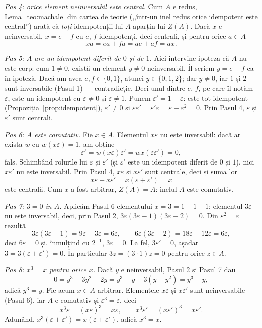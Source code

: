 \begin{solutie}
\smallskip
\textit{Pas 4: orice element neinversabil este central.} Cum $A$ e redus,
Lema~\ref{teo:machale} din cartea de teorie (,,într-un inel redus orice
idempotent este central'') arată că \emph{toți} idempotenții lui $A$
aparțin lui $Z(A)$. Dacă $x$ e neinversabil, $x=e+f$ cu $e$, $f$
idempotenți, deci centrali, și pentru orice $a\in A$
\[
  xa=ea+fa=ae+af=ax .
\]

\smallskip
\textit{Pas 5: $A$ are un idempotent diferit de $0$ și de $1$.} Aici
intervine ipoteza că $A$ nu este corp: cum $1\neq0$, există un element
$y\neq0$ neinversabil. Îl scriem $y=e+f$ ca în ipoteză. Dacă am avea
$e,f\in\{0,1\}$, atunci $y\in\{0,1,2\}$; dar $y\neq0$, iar $1$ și $2$
sunt inversabile (Pasul 1) --- contradicție. Deci unul dintre $e$, $f$,
pe care îl notăm $\varepsilon$, este un idempotent cu $\varepsilon\neq0$ și
$\varepsilon\neq1$. Punem $\varepsilon'=1-\varepsilon$: este tot idempotent
(Propoziția~\ref{prop:idempotent}), $\varepsilon'\neq0$ și
$\varepsilon\varepsilon'=\varepsilon'\varepsilon=\varepsilon-\varepsilon^{2}=0$.
Prin Pasul 4, $\varepsilon$ și $\varepsilon'$ sunt centrali.

\smallskip
\textit{Pas 6: $A$ este comutativ.} Fie $x\in A$. Elementul $x\varepsilon$
nu este inversabil: dacă ar exista $w$ cu $w(x\varepsilon)=1$, am obține
\[
  \varepsilon'=w(x\varepsilon)\varepsilon'=wx(\varepsilon\varepsilon')=0,
\]
fals. Schimbând rolurile lui $\varepsilon$ și $\varepsilon'$ (și
$\varepsilon'$ este un idempotent diferit de $0$ și $1$), nici
$x\varepsilon'$ nu este inversabil. Prin Pasul 4, $x\varepsilon$ și
$x\varepsilon'$ sunt centrale, deci și suma lor
\[
  x\varepsilon+x\varepsilon'=x(\varepsilon+\varepsilon')=x
\]
este centrală. Cum $x$ a fost arbitrar, $Z(A)=A$: inelul $A$ este comutativ.

\smallskip
\textit{Pas 7: $3=0$ în $A$.} Aplicăm Pasul 6 elementului $x=3=1+1+1$:
elementul $3\varepsilon$ nu este inversabil, deci, prin Pasul 2,
$3\varepsilon(3\varepsilon-1)(3\varepsilon-2)=0$. Din
$\varepsilon^{2}=\varepsilon$ rezultă
\[
  3\varepsilon(3\varepsilon-1)=9\varepsilon-3\varepsilon=6\varepsilon,\qquad
  6\varepsilon(3\varepsilon-2)=18\varepsilon-12\varepsilon=6\varepsilon ,
\]
deci $6\varepsilon=0$ și, înmulțind cu $2^{-1}$, $3\varepsilon=0$. La fel,
$3\varepsilon'=0$, așadar $3=3(\varepsilon+\varepsilon')=0$. În particular
$3z=(3\cdot1)z=0$ pentru orice $z\in A$.

\smallskip
\textit{Pas 8: $x^{3}=x$ pentru orice $x$.} Dacă $y$ e neinversabil, Pasul 2
și Pasul 7 dau
\[
  0=y^{3}-3y^{2}+2y=y^{3}-y+3(y-y^{2})=y^{3}-y ,
\]
adică $y^{3}=y$. Fie acum $x\in A$ arbitrar. Elementele $x\varepsilon$ și
$x\varepsilon'$ sunt neinversabile (Pasul 6), iar $A$ e comutativ și
$\varepsilon^{3}=\varepsilon$, deci
\[
  x^{3}\varepsilon=(x\varepsilon)^{3}=x\varepsilon,\qquad
  x^{3}\varepsilon'=(x\varepsilon')^{3}=x\varepsilon' .
\]
Adunând, $x^{3}(\varepsilon+\varepsilon')=x(\varepsilon+\varepsilon')$,
adică $x^{3}=x$.
\end{solutie}

